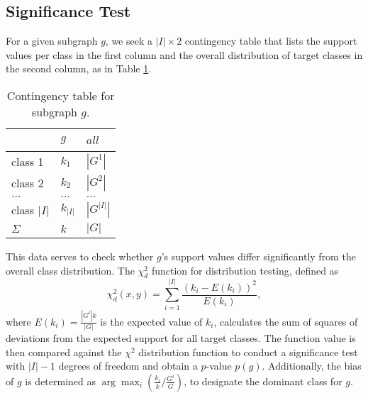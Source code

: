 \documentclass{sig-alternate}
\begin{document}
\subsection{Significance Test}
\label{ss:significance-test}
For a given subgraph $g$, we seek a $|I| \times 2$ contingency table that lists the
support values per class in the first column and the overall distribution of target
classes in the second column, as in Table \ref{t-ContingencyTableIndTest}.
\begin{table}[t]
  \centering
  \begin{tabular}{|l|l|l|}
    \hline
    ~           &	$g$       & $all$       \\\hline
    class 1	    &	$k_1$     & $|G^1|$     \\\hline
    class 2 	  &	$k_2$     & $|G^2|$     \\\hline
    $\ldots$ 	  &	$\ldots$  & $\ldots$    \\\hline
    class $|I|$	&	$k_{|I|}$ & $|G^{|I|}|$ \\\hline
    $\Sigma$	  &	$k$       & $|G|$       \\\hline
  \end{tabular}
  \caption[]{Contingency table for subgraph $g$.}
  \label{t-ContingencyTableIndTest}
\end{table}
This data serves to check whether $g$'s support values differ
significantly from the overall class distribution. The $\chi^2_d$ function for
distribution testing, defined as
\begin{equation}
  \chi^2_d(x,y) = \sum_{i=1}^{|I|} \frac{(k_i-E(k_i))^2}{E(k_i)},
  \label{eq:chid}
\end{equation} 
where $E(k_i)=\frac{|G^{i}| k}{|G|}$ is the expected value of $k_i$, calculates
the sum of squares of deviations from the expected support for all target
classes. The function value is then compared against the $\chi^2$
distribution function to conduct a significance test with
$|I|-1$ degrees of freedom and obtain a $p$-value $p(g)$. 
Additionally, the bias of $g$ is determined as $\arg\max_i (\frac{k_i}{k}/\frac{G^i}{G})$, to designate the dominant class for $g$.
\end{document}
